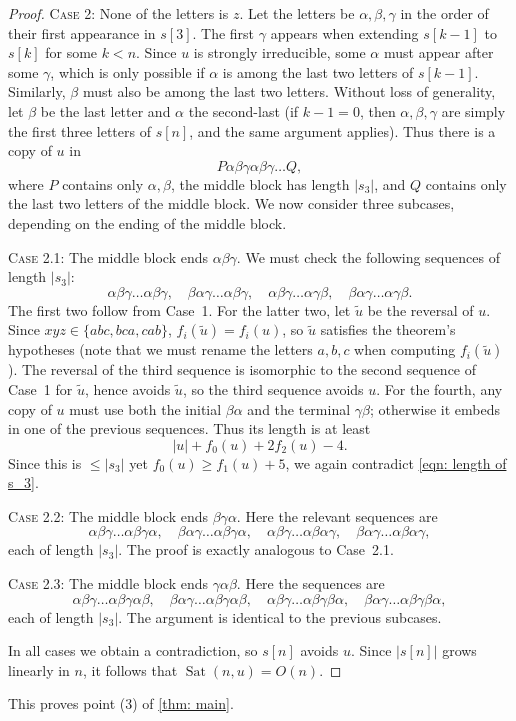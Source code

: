\documentclass[12pt]{amsart}
\DeclareMathOperator{\Sat}{Sat}
\theoremstyle{definition}
\numberwithin{equation}{section}
\numberwithin{table}{thm}
\begin{document}
\begin{proof}
\smallskip
\noindent
\textsc{Case 2:} None of the letters is $z$.  
Let the letters be $\alpha,\beta,\gamma$ in the order of their first appearance in $s[3]$. The first $\gamma$ appears when extending $s[k-1]$ to $s[k]$ for some $k<n$. Since $u$ is strongly irreducible, some $\alpha$ must appear after some $\gamma$, which is only possible if $\alpha$ is among the last two letters of $s[k-1]$. Similarly, $\beta$ must also be among the last two letters. Without loss of generality, let $\beta$ be the last letter and $\alpha$ the second-last (if $k-1=0$, then $\alpha,\beta,\gamma$ are simply the first three letters of $s[n]$, and the same argument applies). Thus there is a copy of $u$ in
\[
P\alpha\beta\gamma\alpha\beta\gamma\dots Q,
\]
where $P$ contains only $\alpha,\beta$, the middle block has length $|s_3|$, and $Q$ contains only the last two letters of the middle block. We now consider three subcases, depending on the ending of the middle block.

\smallskip
\noindent
\textsc{Case 2.1:} The middle block ends $\alpha\beta\gamma$.  
We must check the following sequences of length $|s_3|$:
\[
\alpha\beta\gamma\dots \alpha\beta\gamma,\quad 
\beta\alpha\gamma\dots \alpha\beta\gamma,\quad 
\alpha\beta\gamma\dots \alpha\gamma\beta,\quad 
\beta\alpha\gamma\dots \alpha\gamma\beta.
\]
The first two follow from Case~1. For the latter two, let $\widetilde{u}$ be the reversal of $u$. Since $xyz\in\{abc,bca,cab\}$, $f_i(\widetilde{u})=f_i(u)$, so $\widetilde{u}$ satisfies the theorem’s hypotheses (note that we must rename the letters $a,b,c$ when computing $f_i(\widetilde{u})$). The reversal of the third sequence is isomorphic to the second sequence of Case~1 for $\widetilde{u}$, hence avoids $\widetilde{u}$, so the third sequence avoids $u$. For the fourth, any copy of $u$ must use both the initial $\beta\alpha$ and the terminal $\gamma\beta$; otherwise it embeds in one of the previous sequences. Thus its length is at least
\[
|u| + f_0(u) + 2f_2(u) - 4.
\]
Since this is $\le |s_3|$ yet $f_0(u)\ge f_1(u)+5$, we again contradict \eqref{eqn: length of s_3}.

\smallskip
\noindent
\textsc{Case 2.2:} The middle block ends $\beta\gamma\alpha$.  
Here the relevant sequences are
\[
\alpha\beta\gamma\dots \alpha\beta\gamma\alpha,\quad
\beta\alpha\gamma\dots \alpha\beta\gamma\alpha,\quad
\alpha\beta\gamma\dots \alpha\beta\alpha\gamma,\quad
\beta\alpha\gamma\dots \alpha\beta\alpha\gamma,
\]
each of length $|s_3|$. The proof is exactly analogous to Case~2.1.

\smallskip
\noindent
\textsc{Case 2.3:} The middle block ends $\gamma\alpha\beta$.  
Here the sequences are
\[
\alpha\beta\gamma\dots \alpha\beta\gamma\alpha\beta,\quad
\beta\alpha\gamma\dots \alpha\beta\gamma\alpha\beta,\quad
\alpha\beta\gamma\dots \alpha\beta\gamma\beta\alpha,\quad
\beta\alpha\gamma\dots \alpha\beta\gamma\beta\alpha,
\]
each of length $|s_3|$. The argument is identical to the previous subcases.

\smallskip

In all cases we obtain a contradiction, so $s[n]$ avoids $u$. Since $|s[n]|$ grows linearly in $n$, it follows that $\Sat(n,u)=O(n)$.
\end{proof}
This proves point (3) of \cref{thm: main}.
\end{document}
